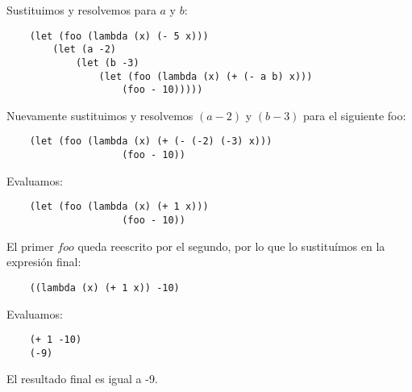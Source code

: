 Sustituimos y resolvemos para $a$ y $b$:
\begin{verbatim}
    (let (foo (lambda (x) (- 5 x)))
        (let (a -2)
            (let (b -3)
                (let (foo (lambda (x) (+ (- a b) x)))
                    (foo - 10)))))
\end{verbatim}

Nuevamente sustituimos y resolvemos $(a -2)$ y $(b -3)$ para el siguiente foo:\\
\begin{verbatim}
    (let (foo (lambda (x) (+ (- (-2) (-3) x)))
                    (foo - 10))
\end{verbatim}
Evaluamos:
\begin{verbatim}
    (let (foo (lambda (x) (+ 1 x)))
                    (foo - 10))
\end{verbatim}
El primer $foo$ queda reescrito por el segundo, por lo que lo sustituímos en la expresión final:
\begin{verbatim}
    ((lambda (x) (+ 1 x)) -10)
\end{verbatim}
Evaluamos:
\begin{verbatim}
    (+ 1 -10)
    (-9)
\end{verbatim}
El resultado final es igual a -9.
